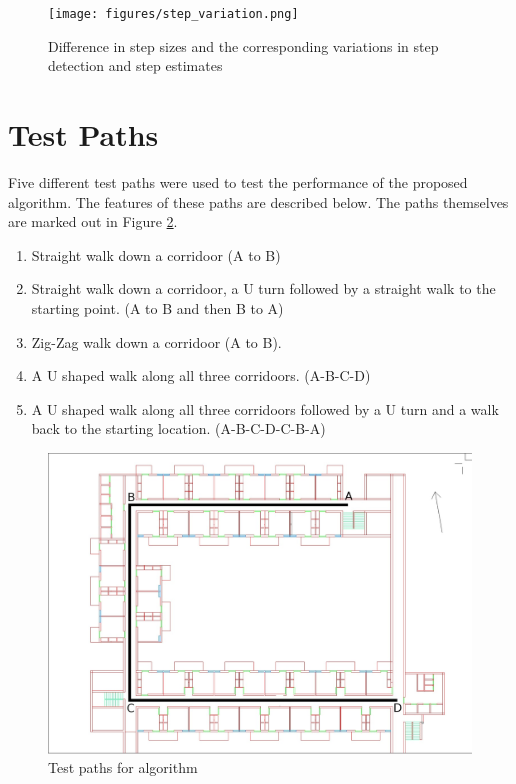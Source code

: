 \begin{figure}
    \centering
    \texttt{[image: figures/step\_variation.png]}
    \caption{Difference in step sizes and the corresponding variations in 
        step detection and step estimates\label{fig:step_variation}}
\end{figure}

\section{Test Paths\label{sec:test_paths}}

Five different test paths were used to test the performance of the proposed 
algorithm.
The features of these paths are described below. The paths themselves
are marked out in Figure \ref{fig:test_paths}.

\begin{enumerate}
\item Straight walk down a corridoor (A to B)
\item Straight walk down a corridoor, a U turn followed by a straight walk 
    to the starting point. (A to B and then B to A)
\item Zig-Zag walk down a corridoor (A to B).
\item A U shaped walk along all three corridoors. (A-B-C-D)
\item A U shaped walk along all three corridoors followed by a U turn and a 
    walk back to the starting location. (A-B-C-D-C-B-A)
\end{enumerate}

\begin{figure}
    \centering
    \includegraphics[width=5in]{figures/test_paths.jpg}
    \caption{Test paths for algorithm\label{fig:test_paths}}
\end{figure}


